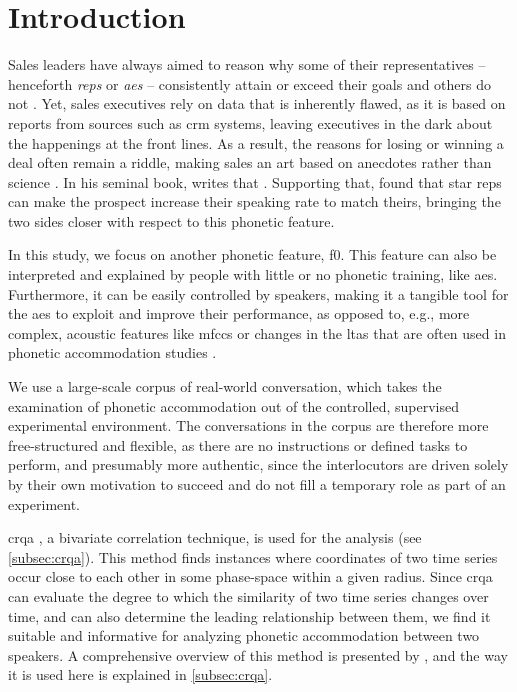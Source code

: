 \section{Introduction}
\label{sec:introduction}

Sales leaders have always aimed to reason why some of their representatives -- henceforth \emph{reps} or \emph{\acp{ae}} -- consistently attain or exceed their goals and others do not \citep{Kovac2017its}.
Yet, sales executives rely on data that is inherently flawed, as it is based on reports from sources such as \ac{crm} systems, leaving executives in the dark about the happenings at the front lines.
As a result, the reasons for losing or winning a deal often remain a riddle, making sales an art based on anecdotes rather than science \citep{Yohn2016best, Martin2017six}.
In his seminal book, \citet{Gladwell2006tipping} writes that .
Supporting that, \citet{Orlob2018nine} found that star reps can make the prospect increase their speaking rate to match theirs, bringing the two sides closer with respect to this phonetic feature.

In this study, we focus on another phonetic feature, \ac{f0}.
This feature can also be interpreted and explained by people with little or no phonetic training, like \acp{ae}.
Furthermore, it can be easily controlled by speakers, making it a tangible tool for the \acp{ae} to exploit and improve their performance, as opposed to, e.g., more complex, acoustic features like \acp{mfcc} or changes in the \ac{ltas} that are often used in phonetic accommodation studies \citep{Levitan2011measuring,Borrie2019syncing}.

We use a large-scale corpus of real-world conversation, which takes the examination of phonetic accommodation out of the controlled, supervised experimental environment.
The conversations in the corpus are therefore more free-structured and flexible, as there are no instructions or defined tasks to perform, and presumably more authentic, since the interlocutors are driven solely by their own motivation to succeed and do not fill a temporary role as part of an experiment.

\Ac{crqa} \citep{Zbilut1998detecting}, a bivariate correlation technique, is used for the analysis (see \cref{subsec:crqa}).
This method finds instances where coordinates of two time series occur close to each other in some phase-space within a given radius.
Since \ac{crqa} can evaluate the degree to which the similarity of two time series changes over time, and can also determine the leading relationship between them, we find it suitable and informative for analyzing phonetic accommodation between two speakers.
A comprehensive overview of this method is presented by \citet{Wallot2018analyzing}, and the way it is used here is explained in \cref{subsec:crqa}.

